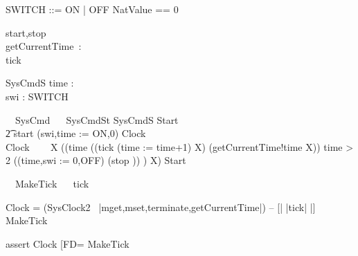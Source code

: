 \begin{zed}
SWITCH ::= ON | OFF
\also NatValue == 0 
\end{zed}

\begin{circus}
  \circchannel start,stop\\
  \circchannel getCurrentTime~:~\nat\\
  \circchannel tick
\end{circus}

\begin{schema}{SysCmdS}
 time : \nat\\
 swi : SWITCH
\end{schema}
\begin{circus}%
  \circprocess\ ~SysCmd ~\circdef~\circbegin
  \circstate SysCmdSt  SysCmdS
  Start ~\circdef~
  \\\t2 start \then (swi,time := ON,0) \circseq Clock\\
  Clock ~\circdef~ 
  \circmu~X \circspot 
    ((\circif time  \circthen ((tick \then (time := time+1) \circseq X) \interleave (getCurrentTime!time \then X))
        \circelse time > 2 \circthen ((time,swi := 0,OFF) \circseq (stop \then \Skip)) 
        \circfi) \circseq X)
  \circspot Start
  \circend
\end{circus}
\begin{circus}
\circprocess\ ~MakeTick ~\circdef~\circbegin
\circspot tick \then \Skip
\circend
\end{circus}

Clock = 
  (SysClock2 \ {|mget,mset,terminate,getCurrentTime|}) 
  -- [| {|tick|} |] MakeTick 

assert Clock [FD= MakeTick
